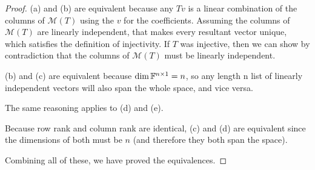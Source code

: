 \begin{enumerate}
    \begin{proof}
        (a) and (b) are equivalent because any $Tv$ is a linear combination of the columns of $\mathcal M(T)$ using the $v$ for the coefficients. Assuming the columns of $\mathcal M(T)$ are linearly independent, that makes every resultant vector unique, which satisfies the definition of injectivity. If $T$ was injective, then we can show by contradiction that the columns of $\mathcal M(T)$ must be linearly independent.

        (b) and (c) are equivalent because $\dim \mathbb{F}^{n \times 1} = n$, so any length n list of linearly independent vectors will also span the whole space, and vice versa.

        The same reasoning applies to (d) and (e).

        Because row rank and column rank are identical, (c) and (d) are equivalent since the dimensions of both must be $n$ (and therefore they both span the space).

        Combining all of these, we have proved the equivalences.
    \end{proof}

\end{enumerate}